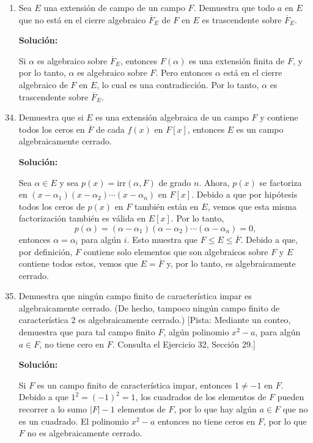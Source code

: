 \begin{enumerate}
    \item Sea $E$ una extensión de campo de un campo $F$. Demuestra que todo $a$ en $E$ que no está en el cierre algebraico $\overline{F}_E$ de $F$ en $E$ es trascendente sobre $\overline{F}_E$.
    
    \textbf{Solución:}
    
    Si $\alpha$ es algebraico sobre $\overline{F}_E$, entonces $F(\alpha)$ es una extensión finita de $F$, y por lo tanto, $\alpha$ es algebraico sobre $F$. Pero entonces $\alpha$ está en el cierre algebraico de $F$ en $E$, lo cual es una contradicción. Por lo tanto, $\alpha$ es trascendente sobre $\overline{F}_E$.
    
\end{enumerate}


\begin{enumerate}
    \setcounter{enumi}{33}
    
    \item Demuestra que si $E$ es una extensión algebraica de un campo $F$ y contiene todos los ceros en $\overline{F}$ de cada $f(x)$ en $F[x]$, entonces $E$ es un campo algebraicamente cerrado.
    
    \textbf{Solución:}
    
    Sea $\alpha \in E$ y sea $p(x) = \text{irr}(\alpha, F)$ de grado $n$. Ahora, $p(x)$ se factoriza en $(x - \alpha_1)(x - \alpha_2) \cdots (x - \alpha_n)$ en $F[x]$. Debido a que por hipótesis todos los ceros de $p(x)$ en $F$ también están en $E$, vemos que esta misma factorización también es válida en $E[x]$. Por lo tanto,
    \[ p(\alpha) = (\alpha - \alpha_1)(\alpha - \alpha_2) \cdots (\alpha - \alpha_n) = 0, \]
    entonces $\alpha = \alpha_i$ para algún $i$. Esto muestra que $F \leq E \leq \overline{F}$. Debido a que, por definición, $F$ contiene solo elementos que son algebraicos sobre $F$ y $E$ contiene todos estos, vemos que $E = \overline{F}$ y, por lo tanto, es algebraicamente cerrado.
    
    \item Demuestra que ningún campo finito de característica impar es algebraicamente cerrado. (De hecho, tampoco ningún campo finito de característica 2 es algebraicamente cerrado.) [Pista: Mediante un conteo, demuestra que para tal campo finito $F$, algún polinomio $x^2 - a$, para algún $a \in F$, no tiene cero en $F$. Consulta el Ejercicio 32, Sección 29.]
    
    \textbf{Solución:}
    
    Si $F$ es un campo finito de característica impar, entonces $1 \neq -1$ en $F$. Debido a que $1^2 = (-1)^2 = 1$, los cuadrados de los elementos de $F$ pueden recorrer a lo sumo $|F| - 1$ elementos de $F$, por lo que hay algún $a \in F$ que no es un cuadrado. El polinomio $x^2 - a$ entonces no tiene ceros en $F$, por lo que $F$ no es algebraicamente cerrado.
    
\end{enumerate}